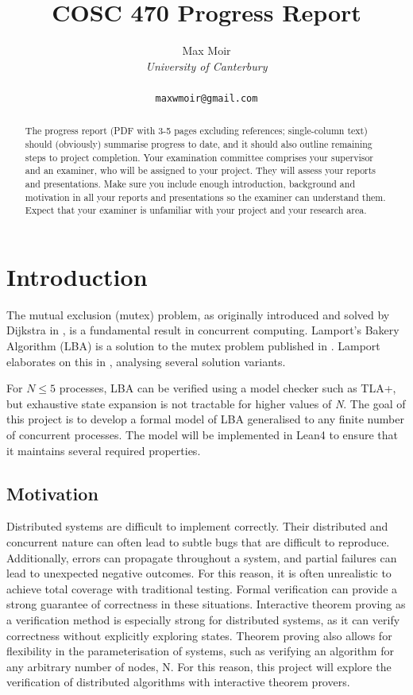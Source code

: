 \documentclass{article}
\title{COSC 470 Progress Report}
\author{
    Max Moir \\
    \textit{University of Canterbury} \\ 
    \text{Christchurch, New Zealand} \\ 
    \texttt{maxwmoir@gmail.com}
}
\theoremstyle{definition}
\begin{document}
\maketitle

\begin{abstract}
The progress report (PDF with 3-5 pages excluding references; single-column text) should (obviously) summarise progress to date, and it should also outline remaining steps to project completion. Your examination committee comprises your supervisor and an examiner, who will be assigned to your project. They will assess your reports and presentations. Make sure you include enough introduction, background and motivation in all your reports and presentations so the examiner can understand them. Expect that your examiner is unfamiliar with your project and your research area.
\end{abstract}

\section{Introduction}
    The mutual exclusion (mutex) problem, as originally introduced and solved by Dijkstra in \cite{dijkstra_solution_1965}, is a fundamental result in concurrent computing.
    Lamport's Bakery Algorithm (LBA) is a solution to the mutex problem published in  \cite{lamport_new_1974}.
    Lamport elaborates on this in \cite{lamport_mutual_1986}, analysing several solution variants.

    For $N \leq 5$ processes, LBA can be verified using a model checker such as TLA+, but exhaustive state expansion is not tractable for higher values of \emph{N}. 
    The goal of this project is to develop a formal model of LBA generalised to any finite number of concurrent processes. 
    The model will be implemented in Lean4 to ensure that it maintains several required properties.

    \subsection{Motivation}

    Distributed systems are difficult to implement correctly. 
    Their distributed and concurrent nature can often lead to subtle bugs that are difficult to reproduce.
    Additionally, errors can propagate throughout a system, and partial failures can lead to unexpected negative outcomes.
    For this reason, it is often unrealistic to achieve total coverage with traditional testing.
    Formal verification can provide a strong guarantee of correctness in these situations.
    Interactive theorem proving as a verification method is especially strong for distributed systems, as it can verify correctness without explicitly exploring states.
    Theorem proving also allows for flexibility in the parameterisation of systems, such as verifying an algorithm for any arbitrary number of nodes, N.
    For this reason, this project will explore the verification of distributed algorithms with interactive theorem provers.
\end{document}

